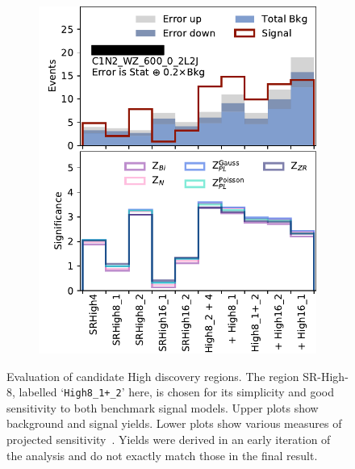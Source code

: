 \begin{figure}[tp]
\begin{subfigure}{0.495\textwidth}
\includegraphics[width=\textwidth]{figures/2ljets_disco_High_C1N2_WZ_600_0_2L2J.png}
\caption{}
\end{subfigure}
\caption[
Evaluation of candidate High discovery regions
]{%
Evaluation of candidate High discovery regions.
The region SR-High-8, labelled `\texttt{High8\_1+\_2}' here, is chosen for its
simplicity and good sensitivity to both benchmark signal models.
Upper plots show background and signal yields.
Lower plots show various measures of projected
sensitivity~\cite{cousins2008evaluation}.
Yields were derived in an early iteration of the analysis and do not exactly
match those in the final result.
}
\label{fig:2ljets_disco_trials_high}
\end{figure}

